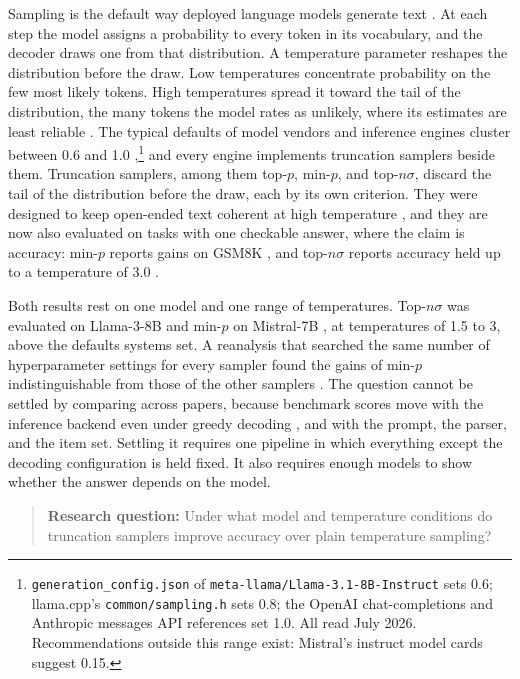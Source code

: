 \documentclass[11pt]{article}
\begin{document}
Sampling is the default way deployed language models generate text \citep{shi2024decoding}.
At each step the model assigns a probability to every token in its vocabulary, and the decoder
draws one from that distribution. A temperature parameter reshapes the distribution before the
draw. Low temperatures concentrate probability on the few most likely tokens. High temperatures
spread it toward the tail of the distribution, the many tokens the model rates as unlikely, where
its estimates are least reliable \citep{holtzman2020curious,hewitt2022truncation}. The typical
defaults of model vendors and inference engines cluster between 0.6 and 1.0
\citep{renze2024temperature,hochlehnert2025sober},\footnote{\texttt{generation\_config.json}
of \texttt{meta-llama/Llama-3.1-8B-Instruct} sets 0.6; llama.cpp's \texttt{common/sampling.h}
sets 0.8; the OpenAI chat-completions and Anthropic messages API references set 1.0. All read
July 2026. Recommendations outside this range exist: Mistral's instruct model cards suggest
0.15.} and every engine implements truncation samplers beside them. Truncation samplers,
among them top-$p$, min-$p$, and top-$n\sigma$, discard the tail of the distribution before the
draw, each by its own criterion. They were designed to keep open-ended text coherent at high
temperature \citep{garcesarias2025decoding}, and they are now also evaluated on tasks with one
checkable answer, where the claim is accuracy: min-$p$ reports gains on GSM8K
\citep{nguyen2024minp}, and top-$n\sigma$ reports accuracy held up to a temperature of 3.0
\citep{tang2024topn}.

Both results rest on one model and one range of temperatures. Top-$n\sigma$ was evaluated on
Llama-3-8B \citep{tang2024topn} and min-$p$ on Mistral-7B \citep{nguyen2024minp}, at
temperatures of 1.5 to 3, above the defaults systems set. A reanalysis that searched the same
number of hyperparameter settings for every sampler found the gains of min-$p$ indistinguishable
from those of the other samplers \citep{schaeffer2025minp}. The question cannot be settled by
comparing across papers, because benchmark scores move with the inference backend even under
greedy decoding \citep{masoudian2026backend}, and with the prompt, the parser, and the item set.
Settling it requires one pipeline in which everything except the decoding configuration is held
fixed. It also requires enough models to show whether the answer depends on the model.

\begin{quote}
\textbf{Research question:} Under what model and temperature conditions do truncation samplers
improve accuracy over plain temperature sampling?
\end{quote}
\end{document}
